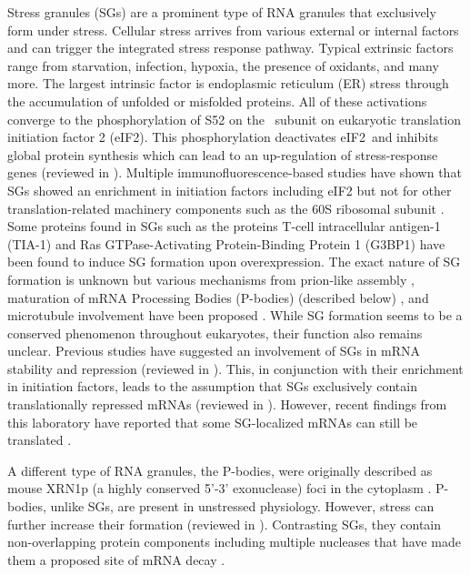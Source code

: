 Stress granules (SGs) are a prominent type of RNA granules that exclusively form under stress.
Cellular stress arrives from various external or internal factors and can trigger the integrated stress response pathway.
Typical extrinsic factors range from starvation, infection, hypoxia, the presence of oxidants, and many more.
The largest intrinsic factor is endoplasmic reticulum (ER) stress through the accumulation of unfolded or misfolded proteins.
All of these activations converge to the phosphorylation of S52 on the \textalpha\ subunit on eukaryotic translation initiation factor 2 (eIF2\textalpha).
This phosphorylation deactivates eIF2\textalpha\ and inhibits global protein synthesis which can lead to an up-regulation of stress-response genes (reviewed in \cite{pakoszebrucka_integrated_2016}).
Multiple immunofluorescence-based studies have shown that SGs showed an enrichment in initiation factors including eIF2 but not for other translation-related machinery components such as the 60S ribosomal subunit \cite{kimball_mammalian_2003}.
Some proteins found in SGs such as the proteins T-cell intracellular antigen-1 (TIA-1) \cite{kedersha_rna-binding_1999} and Ras GTPase-Activating Protein-Binding Protein 1 (G3BP1) \cite{tourriere_rasgap-associated_2003} have been found to induce SG formation upon overexpression.
The exact nature of SG formation is unknown but various mechanisms from prion-like assembly \cite{gilks_stress_2004, shattuck_prion-like_2019}, maturation of mRNA Processing Bodies (P-bodies) (described below) \cite{buchan_p_2008}, and microtubule involvement have been proposed \cite{ivanov_disruption_2003}.
While SG formation seems to be a conserved phenomenon throughout eukaryotes, their function also remains unclear.
Previous studies have suggested an involvement of SGs in mRNA stability and repression (reviewed in \cite{buchan_eukaryotic_2009}).
This, in conjunction with their enrichment in initiation factors, leads to the assumption that SGs exclusively contain translationally repressed mRNAs (reviewed in \cite{thomas_rna_2011}).
However, recent findings from this laboratory have reported that some SG-localized mRNAs can still be translated \cite{mateju_single-molecule_2020}.

A different type of RNA granules, the P-bodies, were originally described as mouse XRN1p (a highly conserved 5'-3' exonuclease) foci in the cytoplasm \cite{bashkirov_mouse_1997}.
P-bodies, unlike SGs, are present in unstressed physiology.
However, stress can further increase their formation (reviewed in \cite{parker_p_2007}).
Contrasting SGs, they contain non-overlapping protein components including multiple nucleases that have made them a proposed site of mRNA decay \cite{sheth_decapping_2003}.

